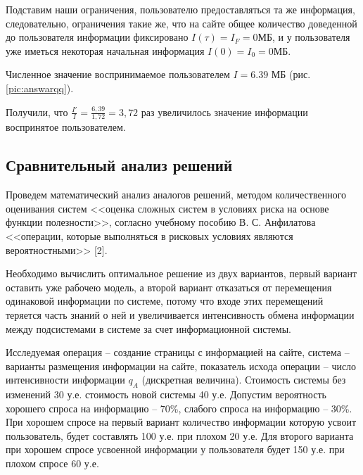 
Подставим наши ограничения, пользователю предоставляться та же информация, следовательно, ограничения такие же, что на сайте общее количество доведенной до пользователя информации фиксировано $I\left( \tau  \right) = I_F = 0 МБ$, и у пользователя уже иметься некоторая начальная информация $I\left( 0 \right) = I_0 = 0 МБ$. 

Численное значение воспринимаемое пользователем $I = 6.39$ МБ (рис. \ref{pic:answarqq}).


Получили, что $ \frac{{I'}}{I} = \frac{{6,39}}{{1,72}} = 3,72 $ раз увеличилось значение информации воспринятое пользователем.






\subsection{Сравнительный анализ решений}
Проведем математический анализ аналогов решений, методом количественного оценивания систем <<оценка сложных систем в условиях риска на основе функции полезности>>, согласно учебному пособию В. С. Анфилатова <<операции, которые выполняться в рисковых условиях являются вероятностными>> [2].

Необходимо вычислить оптимальное решение из двух вариантов, первый вариант оставить уже рабочею модель, а второй вариант отказаться от перемещения одинаковой информации по системе, потому что входе этих перемещений теряется часть знаний о ней и увеличивается интенсивность обмена информации между подсистемами в системе за счет информационной системы.

Исследуемая операция – создание страницы с информацией на сайте, система – варианты размещения информации на сайте, показатель исхода операции – число интенсивности информации $q_A$ (дискретная величина). Стоимость системы без изменений 30 у.е. стоимость новой системы 40 у.е. Допустим вероятность хорошего спроса на информацию -- 70\%, слабого спроса на информацию -- 30\%. При хорошем спросе на первый вариант количество информации которую усвоит пользователь, будет составлять 100 у.е. при плохом 20 у.е. Для второго варианта при хорошем спросе усвоенной информации у пользователя будет 150 у.е. при плохом спросе 60 у.е.

